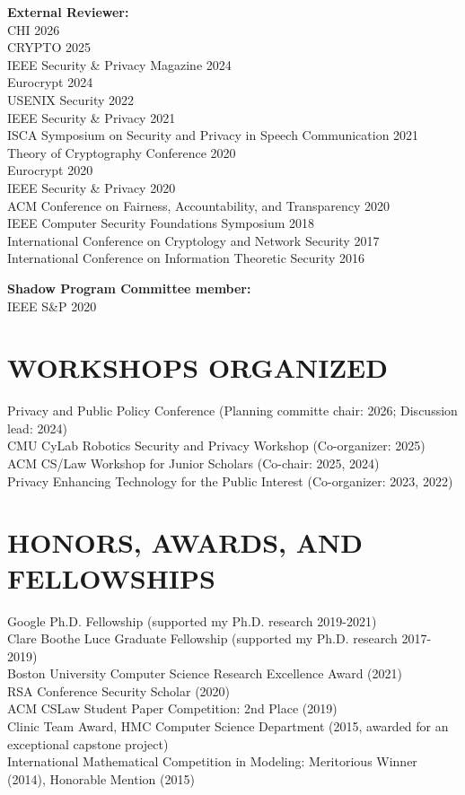 \documentclass{res}
\begin{document}
\begin{resume}
\textbf{External Reviewer:} \\
CHI 2026 \\
CRYPTO 2025 \\
IEEE Security \& Privacy Magazine 2024 \\
Eurocrypt 2024 \\
USENIX Security 2022 \\
IEEE Security \& Privacy 2021 \\
ISCA Symposium on Security and Privacy in Speech Communication 2021 \\
Theory of Cryptography Conference 2020 \\
Eurocrypt 2020 \\
IEEE Security \& Privacy 2020 \\
ACM Conference on Fairness, Accountability, and Transparency 2020 \\
IEEE Computer Security Foundations Symposium 2018 \\
International Conference on Cryptology and Network Security 2017 \\
International Conference on Information Theoretic Security 2016

\textbf{Shadow Program Committee member:} \\
IEEE S\&P 2020



\section{WORKSHOPS ORGANIZED}
\vspace{0.1in}
Privacy and Public Policy Conference (Planning committe chair: 2026; Discussion lead: 2024) \\
CMU CyLab Robotics Security and Privacy Workshop (Co-organizer: 2025) \\
ACM CS/Law Workshop for Junior Scholars (Co-chair: 2025, 2024) \\
Privacy Enhancing Technology for the Public Interest (Co-organizer: 2023, 2022)



\section{HONORS, AWARDS, AND FELLOWSHIPS}
\vspace{0.1in}
    Google Ph.D. Fellowship (supported my Ph.D. research 2019-2021) \\
    Clare Boothe Luce Graduate Fellowship (supported my Ph.D. research 2017-2019) \\
    Boston University Computer Science Research Excellence Award (2021) \\
    RSA Conference Security Scholar (2020) \\
    ACM CSLaw Student Paper Competition: 2nd Place (2019) \\
    Clinic Team Award, HMC Computer Science Department (2015, awarded for an exceptional capstone project) \\
    International Mathematical Competition in Modeling: Meritorious Winner (2014), Honorable Mention (2015) \\       




\end{resume}
\end{document}
